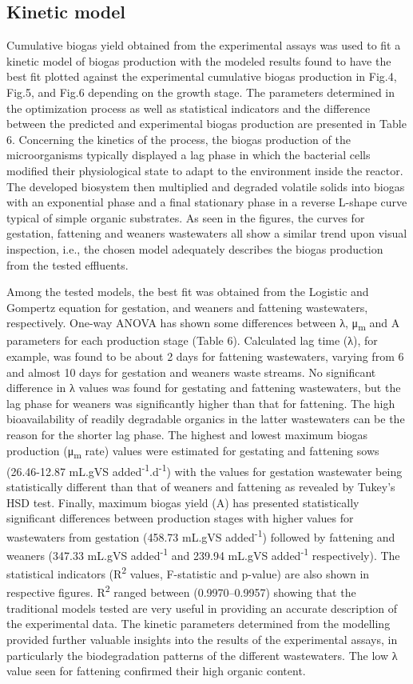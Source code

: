 \subsection{Kinetic model}
Cumulative biogas yield obtained from the experimental assays was used to fit a kinetic model of biogas production with the modeled results found to have the best fit plotted against the experimental cumulative biogas production in Fig.4, Fig.5, and Fig.6 depending on the growth stage. The parameters determined in the optimization process as well as statistical indicators and the difference between the predicted and experimental biogas production are presented in Table 6.
Concerning the kinetics of the process, the biogas production of the microorganisms typically displayed a lag phase in which the bacterial cells modified their physiological state to adapt to the environment inside the reactor. The developed biosystem then multiplied and degraded volatile solids into biogas with an exponential phase and a final stationary phase in a reverse L-shape curve typical of simple organic substrates. As seen in the figures, the curves for gestation, fattening and weaners wastewaters all show a similar trend upon visual inspection, i.e., the chosen model adequately describes the biogas production from the tested effluents. 

Among the tested models, the best fit was obtained from the Logistic and Gompertz equation for gestation, and weaners and fattening wastewaters, respectively. One-way ANOVA has shown some differences between λ, μ\textsubscript{m} and A  parameters for each production stage (Table 6). Calculated lag time (λ), for example, was found to be about 2 days for fattening wastewaters, varying from 6 and almost 10 days for gestation and weaners waste streams. No significant difference in λ values was found for gestating and fattening wastewaters, but the lag phase for weaners was significantly higher than that for fattening. The high bioavailability of readily degradable organics in the latter wastewaters can be the reason for the shorter lag phase. The highest and lowest maximum biogas production (μ\textsubscript{m} rate) values were estimated for gestating and fattening sows (26.46-12.87 mL.gVS added\textsuperscript{-1}.d\textsuperscript{-1}) with the values for gestation wastewater being statistically different than that of weaners and fattening as revealed by Tukey’s HSD test. Finally, maximum biogas yield (A) has presented statistically significant differences between production stages with higher values for wastewaters from gestation (458.73 mL.gVS added\textsuperscript{-1}) followed by fattening and weaners (347.33 mL.gVS added\textsuperscript{-1} and 239.94 mL.gVS added\textsuperscript{-1} respectively). The statistical indicators (R\textsuperscript{2} values, F-statistic and p-value) are also shown in respective figures. R\textsuperscript{2} ranged between (0.9970–0.9957) showing that the traditional models tested are very useful in providing an accurate description of the experimental data. The kinetic parameters determined from the modelling provided further valuable insights into the results of the experimental assays, in particularly the biodegradation patterns of the different wastewaters. The low λ value seen for fattening confirmed their high organic content.